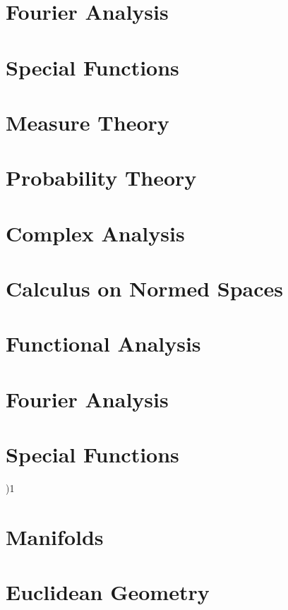 \documentclass{book}                                                           %
\newcommand*{\TOPPATH}{books}
\newcommand*{\PATH}{\TOPPATH/}
\newcounter{endpage}
\def\compilegeometry{)}
\begin{document}
        \part{Fourier Analysis}
            
            
        \part{Special Functions}
            
            
    \else
        \part{Measure Theory}
        \part{Probability Theory}
        \part{Complex Analysis}
        \part{Calculus on Normed Spaces}
        \part{Functional Analysis}
        \part{Fourier Analysis}
        \part{Special Functions}
    \fi
    \clearpage

    \setcounter{endpage}{\thepage}
    \label{book:Geometry}%
    \renewcommand{\PATH}{\TOPPATH/Geometry}
    \setcounter{page}{\value{endpage}}

    \if\compilegeometry1
        \part{Manifolds}
            
        \part{Euclidean Geometry}
            
\end{document}

